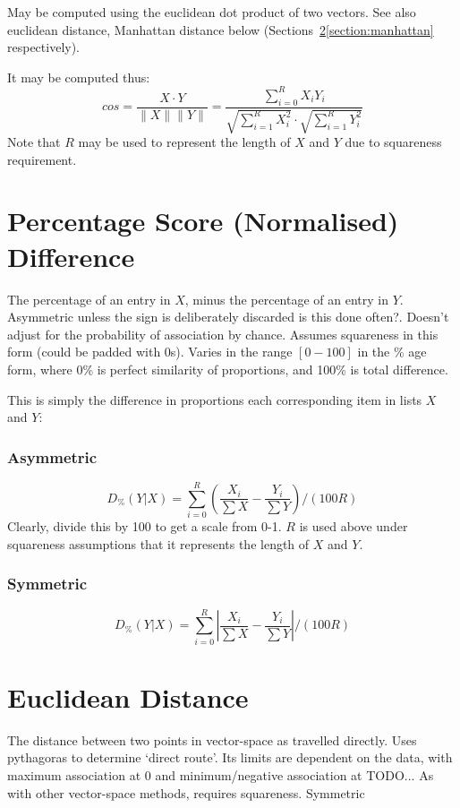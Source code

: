 \documentclass[11pt]{article}
\begin{document}
May be computed using the euclidean dot product of two vectors.  See also euclidean distance, Manhattan distance below (Sections~\ref{section:euclid}\ref{section:manhattan} respectively).

It may be computed thus:
$$
cos = \frac{ X \cdot Y }{ \|X\|\|Y\| } = \frac{  \sum_{i=0}^{R}{ X_iY_i }  }{     \sqrt{ \sum_{i=1}^{R}{X_i^2} }  \cdot  \sqrt{ \sum_{i=1}^{R}{Y_i^2} }    }
$$
Note that $R$ may be used to represent the length of $X$ and $Y$ due to squareness requirement.






\section{Percentage Score (Normalised) Difference}
\label{section:percentage}
The percentage of an entry in $X$, minus the percentage of an entry in $Y$.  Asymmetric unless the sign is deliberately discarded {\color{red} is this done often?}.  Doesn't adjust for the probability of association by chance.  Assumes squareness in this form (could be padded with 0s).  Varies in the range $[0-100]$ in the \% age form, where 0\% is perfect similarity of proportions, and 100\% is total difference.

This is simply the difference in proportions each corresponding item in lists $X$ and $Y$:

\subsubsection{Asymmetric}
$$
D_\%(Y|X) = { \sum_{i=0}^{R}{ \left(  \frac{X_i}{\sum{X}} - \frac{Y_i}{\sum{Y}} \right) }  \bigg / (100R) }
$$
Clearly, divide this by 100 to get a scale from 0-1.  $R$ is used above under squareness assumptions that it represents the length of $X$ and $Y$.

\subsubsection{Symmetric}
$$
D_\%(Y|X) = { \sum_{i=0}^{R}{ \left|  \frac{X_i}{\sum{X}} - \frac{Y_i}{\sum{Y}} \right| }  \bigg / (100R) }
$$





\section{Euclidean Distance}
\label{section:euclid}
The distance between two points in vector-space as travelled directly.  Uses pythagoras to determine `direct route'.  Its limits are dependent on the data, with maximum association at 0 and minimum/negative association at TODO...  As with other vector-space methods, requires squareness.  Symmetric
\end{document}
